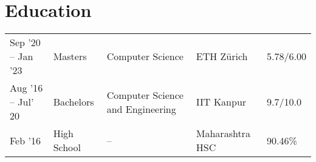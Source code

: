 %

\section*{Education}
\begin{tabulary}{\textwidth}{L L L L L}

\toprule
{} &  &  &  & \\
\midrule
Sep '20 -- Jan '23 & Masters & Computer Science & ETH Zürich & 5.78/6.00\\%
Aug '16 -- Jul' 20 & Bachelors & Computer Science and Engineering & IIT Kanpur & 9.7/10.0\\%
Feb '16 & High School & -- & Maharashtra HSC & 90.46\%\\%
\bottomrule

\end{tabulary}
